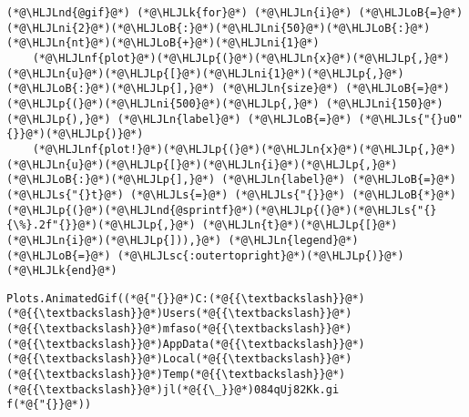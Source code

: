 \documentclass[12pt,a4paper]{article}
\newcommand{\HLJLk}[1]{\textcolor[RGB]{148,91,176}{\textbf{#1}}}
\newcommand{\HLJLn}[1]{#1}
\newcommand{\HLJLnd}[1]{\textcolor[RGB]{214,102,97}{#1}}
\newcommand{\HLJLnf}[1]{\textcolor[RGB]{66,102,213}{#1}}
\newcommand{\HLJLs}[1]{\textcolor[RGB]{201,61,57}{#1}}
\newcommand{\HLJLsc}[1]{\textcolor[RGB]{201,61,57}{#1}}
\newcommand{\HLJLni}[1]{\textcolor[RGB]{59,151,46}{#1}}
\newcommand{\HLJLoB}[1]{\textcolor[RGB]{102,102,102}{\textbf{#1}}}
\newcommand{\HLJLp}[1]{#1}
\begin{document}
\begin{lstlisting}
(*@\HLJLnd{@gif}@*) (*@\HLJLk{for}@*) (*@\HLJLn{i}@*) (*@\HLJLoB{=}@*) (*@\HLJLni{2}@*)(*@\HLJLoB{:}@*)(*@\HLJLni{50}@*)(*@\HLJLoB{:}@*)(*@\HLJLn{nt}@*)(*@\HLJLoB{+}@*)(*@\HLJLni{1}@*) 
    (*@\HLJLnf{plot}@*)(*@\HLJLp{(}@*)(*@\HLJLn{x}@*)(*@\HLJLp{,}@*) (*@\HLJLn{u}@*)(*@\HLJLp{[}@*)(*@\HLJLni{1}@*)(*@\HLJLp{,}@*)(*@\HLJLoB{:}@*)(*@\HLJLp{],}@*) (*@\HLJLn{size}@*) (*@\HLJLoB{=}@*) (*@\HLJLp{(}@*)(*@\HLJLni{500}@*)(*@\HLJLp{,}@*) (*@\HLJLni{150}@*)(*@\HLJLp{),}@*) (*@\HLJLn{label}@*) (*@\HLJLoB{=}@*) (*@\HLJLs{"{}u0"{}}@*)(*@\HLJLp{)}@*)
    (*@\HLJLnf{plot!}@*)(*@\HLJLp{(}@*)(*@\HLJLn{x}@*)(*@\HLJLp{,}@*) (*@\HLJLn{u}@*)(*@\HLJLp{[}@*)(*@\HLJLn{i}@*)(*@\HLJLp{,}@*)(*@\HLJLoB{:}@*)(*@\HLJLp{],}@*) (*@\HLJLn{label}@*) (*@\HLJLoB{=}@*) (*@\HLJLs{"{}t}@*) (*@\HLJLs{=}@*) (*@\HLJLs{"{}}@*) (*@\HLJLoB{*}@*) (*@\HLJLp{(}@*)(*@\HLJLnd{@sprintf}@*)(*@\HLJLp{(}@*)(*@\HLJLs{"{}{\%}.2f"{}}@*)(*@\HLJLp{,}@*) (*@\HLJLn{t}@*)(*@\HLJLp{[}@*)(*@\HLJLn{i}@*)(*@\HLJLp{])),}@*) (*@\HLJLn{legend}@*) (*@\HLJLoB{=}@*) (*@\HLJLsc{:outertopright}@*)(*@\HLJLp{)}@*)
(*@\HLJLk{end}@*)
\end{lstlisting}

\begin{lstlisting}
Plots.AnimatedGif((*@{"{}}@*)C:(*@{{\textbackslash}}@*)(*@{{\textbackslash}}@*)Users(*@{{\textbackslash}}@*)(*@{{\textbackslash}}@*)mfaso(*@{{\textbackslash}}@*)(*@{{\textbackslash}}@*)AppData(*@{{\textbackslash}}@*)(*@{{\textbackslash}}@*)Local(*@{{\textbackslash}}@*)(*@{{\textbackslash}}@*)Temp(*@{{\textbackslash}}@*)(*@{{\textbackslash}}@*)jl(*@{{\_}}@*)084qUj82Kk.gi
f(*@{"{}}@*))
\end{lstlisting}
\end{document}
